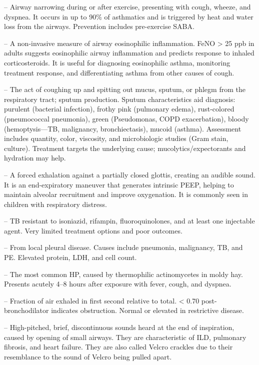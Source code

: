 -- Airway narrowing during or after exercise, presenting with cough, wheeze, and dyspnea. It occurs in up to 90\% of asthmatics and is triggered by heat and water loss from the airways. Prevention includes pre-exercise SABA.

-- A non-invasive measure of airway eosinophilic inflammation. FeNO > 25 ppb in adults suggests eosinophilic airway inflammation and predicts response to inhaled corticosteroids. It is useful for diagnosing eosinophilic asthma, monitoring treatment response, and differentiating asthma from other causes of cough.

-- The act of coughing up and spitting out mucus, sputum, or phlegm from the respiratory tract; sputum production. Sputum characteristics aid diagnosis: purulent (bacterial infection), frothy pink (pulmonary edema), rust-colored (pneumococcal pneumonia), green (Pseudomonas, COPD exacerbation), bloody (hemoptysis—TB, malignancy, bronchiectasis), mucoid (asthma). Assessment includes quantity, color, viscosity, and microbiologic studies (Gram stain, culture). Treatment targets the underlying cause; mucolytics/expectorants and hydration may help.

-- A forced exhalation against a partially closed glottis, creating an audible sound. It is an end-expiratory maneuver that generates intrinsic PEEP, helping to maintain alveolar recruitment and improve oxygenation. It is commonly seen in children with respiratory distress.

-- TB resistant to isoniazid, rifampin, fluoroquinolones, and at least one injectable agent. Very limited treatment options and poor outcomes.

-- From local pleural disease. Causes include pneumonia, malignancy, TB, and PE. Elevated protein, LDH, and cell count.

-- The most common HP, caused by thermophilic actinomycetes in moldy hay. Presents acutely 4--8 hours after exposure with fever, cough, and dyspnea.

-- Fraction of air exhaled in first second relative to total. < 0.70 post-bronchodilator indicates obstruction. Normal or elevated in restrictive disease.

-- High-pitched, brief, discontinuous sounds heard at the end of inspiration, caused by opening of small airways. They are characteristic of ILD, pulmonary fibrosis, and heart failure. They are also called Velcro crackles due to their resemblance to the sound of Velcro being pulled apart.

